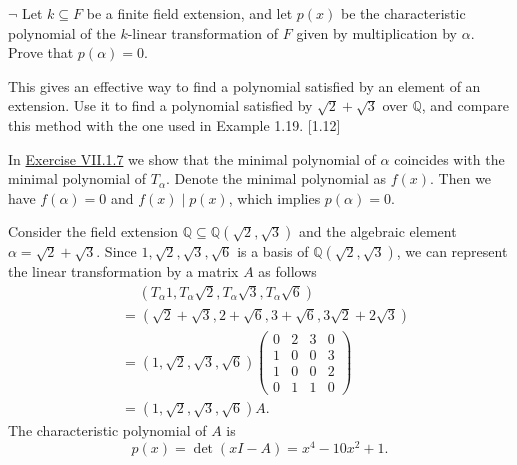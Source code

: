 \hypertarget{Exercise VII.1.11}{}
\begin{problem}[1.11]
	$\neg$ Let $k \subseteq F$ be a finite field extension, and let $p(x)$ be the characteristic polynomial of the $k$-linear transformation of $F$ given by multiplication by $\alpha$. Prove that $p(\alpha)=0$.

	\hspace{2em}This gives an effective way to find a polynomial satisfied by an element of an extension. Use it to find a polynomial satisfied by $\sqrt{2}+\sqrt{3}$ over $\mathbb{Q}$, and compare this method with the one used in Example 1.19. [1.12]
\end{problem}
\begin{solution}
	In \hyperlink{Exercise VII.1.7}{Exercise VII.1.7} we show that the minimal polynomial of $\alpha$ coincides with the minimal polynomial of $T_\alpha$. Denote the minimal polynomial as $f(x)$. Then we have $f(\alpha)=0$ and $f(x)\mid p(x)$, which implies $p(\alpha)=0$. 

	Consider the field extension $\mathbb{Q}\subseteq\mathbb{Q}(\sqrt{2},\sqrt{3})$ and the algebraic element $\alpha=\sqrt{2}+\sqrt{3}$. Since $1, \sqrt{2}, \sqrt{3}, \sqrt{6}$ is a basis of $\mathbb{Q}(\sqrt{2},\sqrt{3})$, we can represent the linear transformation by a matrix $A$ as follows
	\begin{align*}
		&\hspace{15pt}\left(T_\alpha 1,T_\alpha\sqrt{2},T_\alpha\sqrt{3},T_\alpha\sqrt{6}\right)\\
		&=\left(\sqrt{2}+\sqrt{3},2+\sqrt{6},3+\sqrt{6},3\sqrt{2}+2\sqrt{3}\right)\\
		&=\left(1,\sqrt{2},\sqrt{3},\sqrt{6}\right)
		\begin{pmatrix}
			0&2&3&0\\
			1&0&0&3\\
			1&0&0&2\\
			0&1&1&0
		\end{pmatrix}\\
		&=\left(1,\sqrt{2},\sqrt{3},\sqrt{6}\right)A.
	\end{align*}
	The characteristic polynomial of $A$ is
	\[
		p(x)=\det(xI-A)=x^4-10x^2+1.
	\]
\end{solution}

